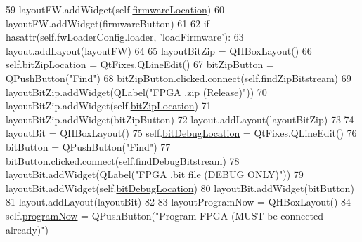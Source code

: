 \begin{DoxyCode}
{59         layoutFW.addWidget(self.\hyperlink{classsoftware_1_1chipwhisperer_1_1capture_1_1scopes_1_1cwhardware_1_1ChipWhispererFWLoaderGUI_1_1FWLoaderConfigGUI_a751c52e2e0d4ef2f27dcfd151b109dce}{firmwareLocation})
60         layoutFW.addWidget(firmwareButton)
61 
62         \textcolor{keywordflow}{if} hasattr(self.fwLoaderConfig.loader, \textcolor{stringliteral}{'loadFirmware'}):
63             layout.addLayout(layoutFW)
64 
65         layoutBitZip = QHBoxLayout()
66         self.\hyperlink{classsoftware_1_1chipwhisperer_1_1capture_1_1scopes_1_1cwhardware_1_1ChipWhispererFWLoaderGUI_1_1FWLoaderConfigGUI_a093c247e087b9827b64c3bd1e19287fe}{bitZipLocation} = QtFixes.QLineEdit()
67         bitZipButton = QPushButton(\textcolor{stringliteral}{"Find"})
68         bitZipButton.clicked.connect(self.\hyperlink{classsoftware_1_1chipwhisperer_1_1capture_1_1scopes_1_1cwhardware_1_1ChipWhispererFWLoaderGUI_1_1FWLoaderConfigGUI_a628d5b2f45b993398b1083dde4b467c2}{findZipBitstream})
69         layoutBitZip.addWidget(QLabel(\textcolor{stringliteral}{"FPGA .zip (Release)"}))
70         layoutBitZip.addWidget(self.\hyperlink{classsoftware_1_1chipwhisperer_1_1capture_1_1scopes_1_1cwhardware_1_1ChipWhispererFWLoaderGUI_1_1FWLoaderConfigGUI_a093c247e087b9827b64c3bd1e19287fe}{bitZipLocation})
71         layoutBitZip.addWidget(bitZipButton)
72         layout.addLayout(layoutBitZip)
73 
74         layoutBit = QHBoxLayout()
75         self.\hyperlink{classsoftware_1_1chipwhisperer_1_1capture_1_1scopes_1_1cwhardware_1_1ChipWhispererFWLoaderGUI_1_1FWLoaderConfigGUI_a73610577984ec8c124ccc449fc4caf52}{bitDebugLocation} = QtFixes.QLineEdit()
76         bitButton = QPushButton(\textcolor{stringliteral}{"Find"})
77         bitButton.clicked.connect(self.\hyperlink{classsoftware_1_1chipwhisperer_1_1capture_1_1scopes_1_1cwhardware_1_1ChipWhispererFWLoaderGUI_1_1FWLoaderConfigGUI_a513854080cf82c9b8755821158e80f26}{findDebugBitstream})
78         layoutBit.addWidget(QLabel(\textcolor{stringliteral}{"FPGA .bit file (DEBUG ONLY)"}))
79         layoutBit.addWidget(self.\hyperlink{classsoftware_1_1chipwhisperer_1_1capture_1_1scopes_1_1cwhardware_1_1ChipWhispererFWLoaderGUI_1_1FWLoaderConfigGUI_a73610577984ec8c124ccc449fc4caf52}{bitDebugLocation})
80         layoutBit.addWidget(bitButton)
81         layout.addLayout(layoutBit)
82 
83         layoutProgramNow = QHBoxLayout()
84         self.\hyperlink{classsoftware_1_1chipwhisperer_1_1capture_1_1scopes_1_1cwhardware_1_1ChipWhispererFWLoaderGUI_1_1FWLoaderConfigGUI_ada530ce59d28952a7c416d2886d5f700}{programNow} = QPushButton(\textcolor{stringliteral}{"Program FPGA (MUST be connected already)"})
}
\end{DoxyCode}
